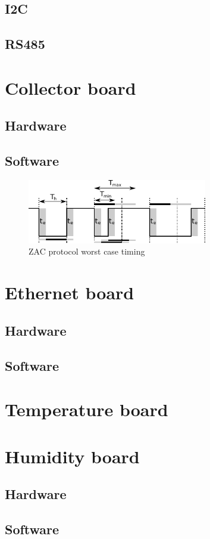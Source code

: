 \documentclass[a4paper]{scrreprt}
\begin{document}
\subsection{I2C}
\subsection{RS485}

\section{Collector board}
\subsection{Hardware}
\subsection{Software}
\begin{figure}
	\centering
	\includegraphics[width=0.7\textwidth]{img/zac_timing.pdf}
	\caption{ZAC protocol worst case timing}
	\label{fig:zactiming}
\end{figure}
\section{Ethernet board}
\subsection{Hardware}
\subsection{Software}
\section{Temperature board}
\section{Humidity board}
\subsection{Hardware}
\subsection{Software}


\end{document}
